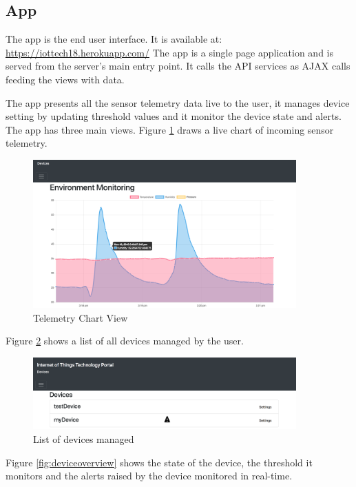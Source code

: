 \subsection{App}

The app is the end user interface. It is available at: \href{https://iottech18.herokuapp.com/}{https://iottech18.herokuapp.com/} The app is a single page application and is served from the server's main entry point. It calls the API services as AJAX calls feeding the views with data. 

The app presents all the sensor telemetry data live to the user, it manages device setting by updating threshold values and it monitor the device state and alerts. The app has three main views.
Figure \ref{fig:chartview} draws a live chart of incoming sensor telemetry. 

\begin{figure}[H]
    \centering
    \includegraphics[width=0.9\textwidth]{figures/App/app_dashboard}
    \caption{Telemetry Chart View}
    \label{fig:chartview}
\end{figure}

Figure \ref{fig:devicelist} shows a list of all devices managed by the user. 

\begin{figure}[H]
    \centering
    \includegraphics[width=0.9\textwidth]{figures/App/app_device_list}
    \caption{List of devices managed}
    \label{fig:devicelist}
\end{figure}

Figure \ref{fig:deviceoverview} shows the state of the device, the threshold it monitors and the alerts raised by the device monitored in real-time.

